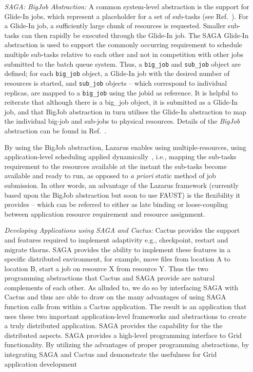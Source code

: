 \documentclass[conference,final]{IEEEtran}
\begin{document}
{\it SAGA: BigJob Abstraction:} A common system-level abstraction is
the support for Glide-In jobs, which represent a placeholder for a
set of sub-tasks (see Ref.~\cite{citeulike:291860}).  For a Glide-In
job, a sufficiently large chunk of resources is requested. Smaller
sub-tasks can then rapidly be executed through the Glide-In job.
The SAGA Glide-In abstraction is used to support the commonly
occurring requirement to schedule multiple sub-tasks relative to each
other and not in competition with other jobs submitted to the batch
queue system.  Thus, a \texttt{big\_job} and \texttt{sub\_job} object
are defined; for each \texttt{big\_job} object, a Glide-In job with
the desired number of resources is started, and \texttt{sub\_job}
objects -- which correspond to individual replicas, are mapped to a
\texttt{big\_job} using the jobid as reference. It is helpful to
reiterate that although there is a big\_job object, it is submitted as
a Glide-In job, and that BigJob abstraction in turn utilises the
Glide-In abstraction to map the individual big-job and sub-jobs to
physical resources.  Details of the \emph{BigJob} abstraction can be
found in Ref.~\cite{saga_royalsoc}.

By using the BigJob abstraction, Lazarus enables using
multiple-resources, using application-level scheduling applied
dynamically~\cite{saga_tg08}, i.e., mapping the sub-tasks requirement
to the resources available at the instant the sub-tasks become
available and ready to run, as opposed to {\it a priori} static method
of job submission.  In other words, an advantage of the Lazarus
framework (currently based upon the BigJob abstraction but soon to use
FAUST) is the flexibility it provides -- which can be referred to
either as late binding or loose-coupling between application resource
requirement and resource assignment.

{\it Developing Applications using SAGA and Cactus:} Cactus provides
the support and features required to implement adaptivity e.g.,
checkpoint, restart and migrate thorns. SAGA provides the ability to
implement these features in a specific distributed environment, for
example, move files from location A to location B, start a job on
resource X from resource Y.  Thus the two programming abstractions
that Cactus and SAGA provide are natural complements of each other.
As alluded to, we do so by interfacing SAGA with Cactus and thus are
able to draw on the many advantages of using SAGA function calls from
within a Cactus application.  The result is an application that uses
these two important application-level frameworks and abstractions to
create a truly distributed application.  SAGA provides the capability
for the the distributed aspects. SAGA provides a high-level
programming interface to Grid functionality. By utilizing the
advantages of proper programming abstractions, by integrating SAGA and
Cactus and demonstrate the usefulness for Grid application development
\end{document}
